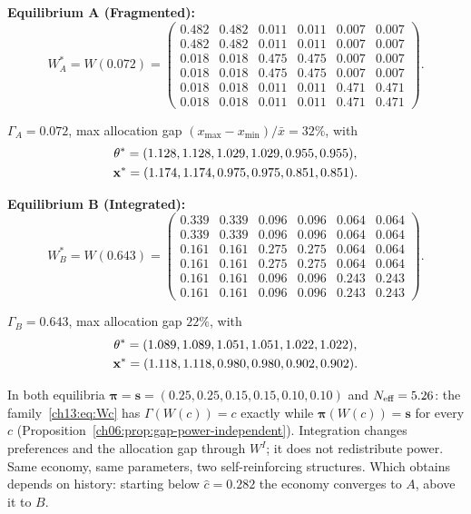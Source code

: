 \documentclass[../structural_economics_book.tex]{subfiles}
\begin{document}
\begin{example}
\textbf{Equilibrium A (Fragmented):}
{\setlength{\arraycolsep}{3pt}
\begin{equation}
W^*_A = W(0.072) = \begin{pmatrix}
0.482 & 0.482 & 0.011 & 0.011 & 0.007 & 0.007 \\
0.482 & 0.482 & 0.011 & 0.011 & 0.007 & 0.007 \\
0.018 & 0.018 & 0.475 & 0.475 & 0.007 & 0.007 \\
0.018 & 0.018 & 0.475 & 0.475 & 0.007 & 0.007 \\
0.018 & 0.018 & 0.011 & 0.011 & 0.471 & 0.471 \\
0.018 & 0.018 & 0.011 & 0.011 & 0.471 & 0.471
\end{pmatrix}.
\end{equation}}

$\Gamma_A = 0.072$, max allocation gap $(x_{\max} - x_{\min})/\bar x = 32\%$, with
\begin{gather*}
\theta^* = (1.128, 1.128, 1.029, 1.029, 0.955, 0.955), \\ \mathbf{x}^* = (1.174, 1.174, 0.975, 0.975, 0.851, 0.851).
\end{gather*}

\textbf{Equilibrium B (Integrated):}
{\setlength{\arraycolsep}{3pt}
\begin{equation}
W^*_B = W(0.643) = \begin{pmatrix}
0.339 & 0.339 & 0.096 & 0.096 & 0.064 & 0.064 \\
0.339 & 0.339 & 0.096 & 0.096 & 0.064 & 0.064 \\
0.161 & 0.161 & 0.275 & 0.275 & 0.064 & 0.064 \\
0.161 & 0.161 & 0.275 & 0.275 & 0.064 & 0.064 \\
0.161 & 0.161 & 0.096 & 0.096 & 0.243 & 0.243 \\
0.161 & 0.161 & 0.096 & 0.096 & 0.243 & 0.243
\end{pmatrix}.
\end{equation}}

$\Gamma_B = 0.643$, max allocation gap $22\%$, with
\begin{gather*}
\theta^* = (1.089, 1.089, 1.051, 1.051, 1.022, 1.022), \\ \mathbf{x}^* = (1.118, 1.118, 0.980, 0.980, 0.902, 0.902).
\end{gather*}

In both equilibria $\boldsymbol{\pi} = \mathbf{s} = (0.25, 0.25, 0.15, 0.15, 0.10, 0.10)$ and $N_{\text{eff}} = 5.26$: the family~\eqref{ch13:eq:Wc} has $\Gamma(W(c)) = c$ exactly while $\boldsymbol{\pi}(W(c)) = \mathbf{s}$ for every $c$ (Proposition~\ref{ch06:prop:gap-power-independent}). Integration changes preferences and the allocation gap through $W^I$; it does not redistribute power. Same economy, same parameters, two self-reinforcing structures. Which obtains depends on history: starting below $\hat c = 0.282$ the economy converges to $A$, above it to $B$.


\end{example}
\end{document}
